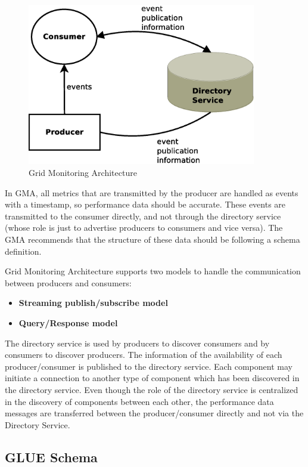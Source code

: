 \begin{figure}[htb]
\centering
 \includegraphics[width=100mm]{images/gma.eps}
\caption{Grid Monitoring Architecture}
\label{figure:gma}
\end{figure}

In GMA, all metrics that are transmitted by the producer are handled as events with a timestamp, so performance data should be accurate. These events are transmitted to the consumer directly, and not through the directory service (whose role is just to advertise producers to consumers and vice versa). The GMA recommends that the structure of these data should be following a schema definition. 

Grid Monitoring Architecture supports two models to handle the communication between producers and consumers:

\begin{itemize}
\item {\bf Streaming publish/subscribe model}
\item {\bf Query/Response model}
\end{itemize}

The directory service is used by producers to discover consumers and by consumers to discover producers. The information of the availability of each producer/consumer is published to the directory service. Each component may initiate a connection to another type of component which has been discovered in the directory service. Even though the role of the directory service is centralized in the discovery of components between each other, the performance data messages are transferred between the producer/consumer directly and not via the Directory Service.

\subsection{GLUE Schema}

